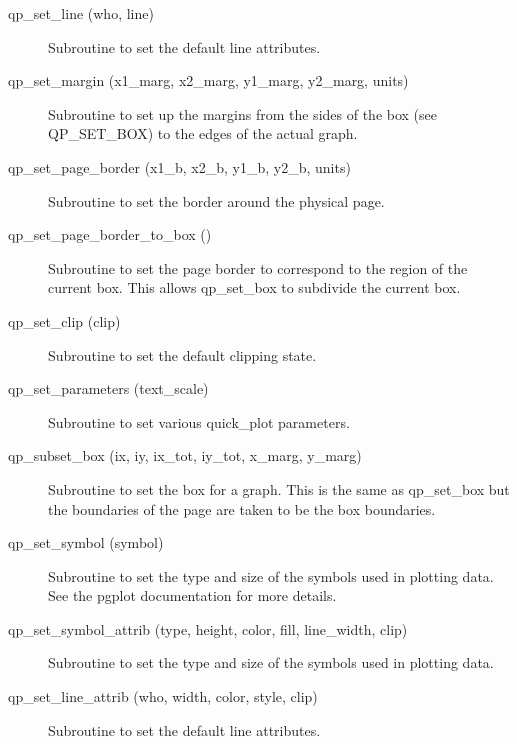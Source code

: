 \begin{description}
\label{r:qp.set.line}
\item[qp_set_line (who, line)] \Newline 
     Subroutine to set the default line attributes.

\label{r:qp.set.margin}
\item[qp_set_margin (x1_marg, x2_marg, y1_marg, y2_marg, units)] \Newline 
Subroutine to set up the margins from the sides of the box (see QP_SET_BOX)
to the edges of the actual graph.

\label{r:qp.set.page.border}
\item[qp_set_page_border (x1_b, x2_b, y1_b, y2_b, units)] \Newline 
     Subroutine to set the border around the physical page.

\label{r:qp.set.page.border.to.box}
\item[qp_set_page_border_to_box ()] \Newline 
Subroutine to set the page border to correspond to the region of the
current box. This allows qp_set_box to subdivide the current box.

\label{r:qp.set.clip}
\item[qp_set_clip (clip)] \Newline 
     Subroutine to set the default clipping state.

\label{r:qp.set.parameters}
\item[qp_set_parameters (text_scale)] \Newline 
Subroutine to set various quick_plot parameters.

\label{r:qp.subset.box}
\item[qp_subset_box (ix, iy, ix_tot, iy_tot, x_marg, y_marg)] \Newline 
     Subroutine to set the box for a graph. This is the same as
     qp_set_box but the boundaries of the page are taken to be the box boundaries.

\label{r:qp.set.symbol}
\item[qp_set_symbol (symbol)] \Newline 
     Subroutine to set the type and size of the symbols used in plotting data.
     See the pgplot documentation for more details.

\label{r:qp.set.symbol.attrib}
\item[qp_set_symbol_attrib (type, height, color, fill, line_width, clip)] \Newline 
     Subroutine to set the type and size of the symbols used in plotting data.

\label{r:qp.set.line.attrib}
\item[qp_set_line_attrib (who, width, color, style, clip)] \Newline 
     Subroutine to set the default line attributes.


\end{description}
